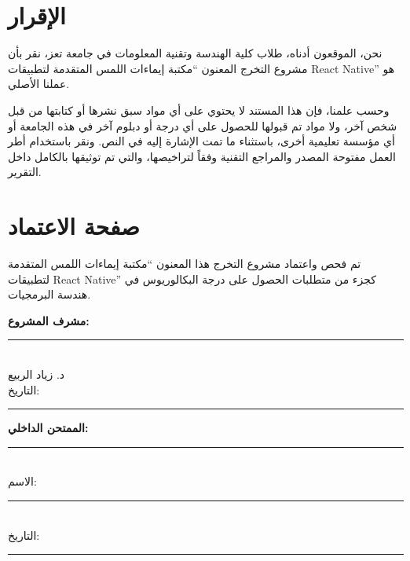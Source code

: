 \documentclass[12pt,a4paper]{report}
\begin{document}
\titlespacing*{\chapter}{0pt}{-30pt}{20pt}



\begin{Arabic}
\chapter*{الإقرار}

نحن، الموقعون أدناه، طلاب كلية الهندسة وتقنية المعلومات في جامعة تعز، نقر بأن مشروع التخرج المعنون ``مكتبة إيماءات اللمس المتقدمة لتطبيقات React Native'' هو عملنا الأصلي.

وحسب علمنا، فإن هذا المستند لا يحتوي على أي مواد سبق نشرها أو كتابتها من قبل شخص آخر، ولا مواد تم قبولها للحصول على أي درجة أو دبلوم آخر في هذه الجامعة أو أي مؤسسة تعليمية أخرى، باستثناء ما تمت الإشارة إليه في النص. ونقر باستخدام أطر العمل مفتوحة المصدر والمراجع التقنية وفقاً لتراخيصها، والتي تم توثيقها بالكامل داخل التقرير.

\chapter*{صفحة الاعتماد}

تم فحص واعتماد مشروع التخرج هذا المعنون ``مكتبة إيماءات اللمس المتقدمة لتطبيقات React Native'' كجزء من متطلبات الحصول على درجة البكالوريوس في هندسة البرمجيات.

\vspace{1.5cm}

\noindent\textbf{مشرف المشروع:}\\
\noindent\rule{8cm}{0.4pt}\\
د. زياد الربيع\\
التاريخ: \rule{4cm}{0.4pt}

\vspace{0.75cm}

\noindent\textbf{الممتحن الداخلي:}\\
\noindent\rule{8cm}{0.4pt}\\
الاسم: \rule{5cm}{0.4pt}\\
التاريخ: \rule{4cm}{0.4pt}


\end{Arabic}
\end{document}
